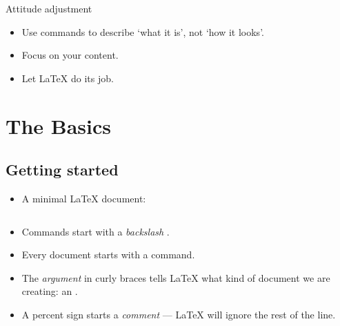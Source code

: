 \documentclass{beamer}
\begin{document}
    \begin{frame}[fragile]{Attitude adjustment}
    
    \begin{itemize}
    \item Use commands to describe `what it is', not `how it looks'.
    \item Focus on your content.
    \item Let \LaTeX{} do its job.
    \end{itemize}
    \end{frame}
    
    \section{The Basics}
    
    \subsection{Getting started}
    \begin{frame}[fragile]{\insertsubsection}
    \begin{itemize}
    \item A minimal \LaTeX{} document:
    \inputminted[frame=single]{latex}{basics.tex}
    \item Commands start with a \emph{backslash} \keystrokebftt{\bs}.
    \item Every document starts with a  command.
    \item The \emph{argument} in curly braces \keystrokebftt{\{} \keystrokebftt{\}} tells \LaTeX{} what kind of document we are creating: an .
    \item A percent sign \keystrokebftt{\%} starts a \emph{comment} --- \LaTeX{}
    will ignore the rest of the line.
    \end{itemize}
    \end{frame}
    
\end{document}
